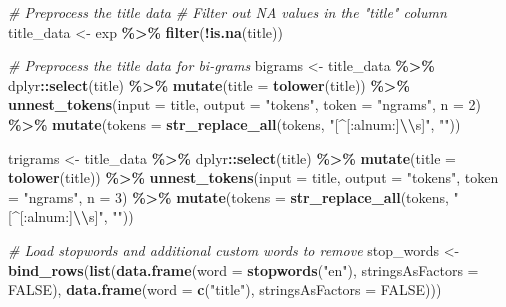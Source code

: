 \documentclass[11pt,]{article}
\newenvironment{Shaded}{\begin{snugshade}}{\end{snugshade}}
\newcommand{\AttributeTok}[1]{\textcolor[rgb]{0.13,0.29,0.53}{#1}}
\newcommand{\CommentTok}[1]{\textcolor[rgb]{0.56,0.35,0.01}{\textit{#1}}}
\newcommand{\ConstantTok}[1]{\textcolor[rgb]{0.56,0.35,0.01}{#1}}
\newcommand{\DecValTok}[1]{\textcolor[rgb]{0.00,0.00,0.81}{#1}}
\newcommand{\FunctionTok}[1]{\textcolor[rgb]{0.13,0.29,0.53}{\textbf{#1}}}
\newcommand{\NormalTok}[1]{#1}
\newcommand{\OtherTok}[1]{\textcolor[rgb]{0.56,0.35,0.01}{#1}}
\newcommand{\SpecialCharTok}[1]{\textcolor[rgb]{0.81,0.36,0.00}{\textbf{#1}}}
\newcommand{\StringTok}[1]{\textcolor[rgb]{0.31,0.60,0.02}{#1}}
\begin{document}
\begin{Shaded}
\begin{Highlighting}[]
\CommentTok{\# Preprocess the title data}
\CommentTok{\# Filter out NA values in the "title" column}
\NormalTok{title\_data }\OtherTok{\textless{}{-}}\NormalTok{ exp }\SpecialCharTok{\%\textgreater{}\%}
  \FunctionTok{filter}\NormalTok{(}\SpecialCharTok{!}\FunctionTok{is.na}\NormalTok{(title))}

\CommentTok{\# Preprocess the title data for bi{-}grams}
\NormalTok{bigrams }\OtherTok{\textless{}{-}}\NormalTok{ title\_data }\SpecialCharTok{\%\textgreater{}\%}
\NormalTok{  dplyr}\SpecialCharTok{::}\FunctionTok{select}\NormalTok{(title) }\SpecialCharTok{\%\textgreater{}\%}
  \FunctionTok{mutate}\NormalTok{(}\AttributeTok{title =} \FunctionTok{tolower}\NormalTok{(title)) }\SpecialCharTok{\%\textgreater{}\%}
  \FunctionTok{unnest\_tokens}\NormalTok{(}\AttributeTok{input =}\NormalTok{ title, }\AttributeTok{output =} \StringTok{"tokens"}\NormalTok{, }\AttributeTok{token =} \StringTok{"ngrams"}\NormalTok{, }\AttributeTok{n =} \DecValTok{2}\NormalTok{) }\SpecialCharTok{\%\textgreater{}\%}
  \FunctionTok{mutate}\NormalTok{(}\AttributeTok{tokens =} \FunctionTok{str\_replace\_all}\NormalTok{(tokens, }\StringTok{"[\^{}[:alnum:]}\SpecialCharTok{\textbackslash{}\textbackslash{}}\StringTok{s]"}\NormalTok{, }\StringTok{""}\NormalTok{))}

\NormalTok{trigrams }\OtherTok{\textless{}{-}}\NormalTok{ title\_data }\SpecialCharTok{\%\textgreater{}\%}
\NormalTok{  dplyr}\SpecialCharTok{::}\FunctionTok{select}\NormalTok{(title) }\SpecialCharTok{\%\textgreater{}\%}
  \FunctionTok{mutate}\NormalTok{(}\AttributeTok{title =} \FunctionTok{tolower}\NormalTok{(title)) }\SpecialCharTok{\%\textgreater{}\%}
  \FunctionTok{unnest\_tokens}\NormalTok{(}\AttributeTok{input =}\NormalTok{ title, }\AttributeTok{output =} \StringTok{"tokens"}\NormalTok{, }\AttributeTok{token =} \StringTok{"ngrams"}\NormalTok{, }\AttributeTok{n =} \DecValTok{3}\NormalTok{) }\SpecialCharTok{\%\textgreater{}\%}
  \FunctionTok{mutate}\NormalTok{(}\AttributeTok{tokens =} \FunctionTok{str\_replace\_all}\NormalTok{(tokens, }\StringTok{"[\^{}[:alnum:]}\SpecialCharTok{\textbackslash{}\textbackslash{}}\StringTok{s]"}\NormalTok{, }\StringTok{""}\NormalTok{))}

\CommentTok{\# Load stopwords and additional custom words to remove}
\NormalTok{stop\_words }\OtherTok{\textless{}{-}} \FunctionTok{bind\_rows}\NormalTok{(}\FunctionTok{list}\NormalTok{(}\FunctionTok{data.frame}\NormalTok{(}\AttributeTok{word =} \FunctionTok{stopwords}\NormalTok{(}\StringTok{"en"}\NormalTok{), }
                                        \AttributeTok{stringsAsFactors =} \ConstantTok{FALSE}\NormalTok{),}
                             \FunctionTok{data.frame}\NormalTok{(}\AttributeTok{word =} \FunctionTok{c}\NormalTok{(}\StringTok{"title"}\NormalTok{), }
                                        \AttributeTok{stringsAsFactors =} \ConstantTok{FALSE}\NormalTok{)))}


\end{Highlighting}
\end{Shaded}
\end{document}
